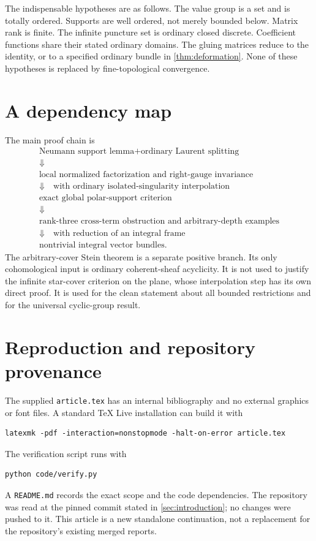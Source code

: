 \documentclass[11pt,letterpaper]{article}
\theoremstyle{definition}
\theoremstyle{remark}
\numberwithin{equation}{section}
\begin{document}
The indispensable hypotheses are as follows. The value group is a set and is totally ordered. Supports are well ordered, not merely bounded below. Matrix rank is finite. The infinite puncture set is ordinary closed discrete. Coefficient functions share their stated ordinary domains. The gluing matrices reduce to the identity, or to a specified ordinary bundle in \cref{thm:deformation}. None of these hypotheses is replaced by fine-topological convergence.

\section{A dependency map}

The main proof chain is
\[
\begin{gathered}
\text{Neumann support lemma}+\text{ordinary Laurent splitting}\\
\Downarrow\\
\text{local normalized factorization and right-gauge invariance}\\
\Downarrow\quad\text{with ordinary isolated-singularity interpolation}\\
\text{exact global polar-support criterion}\\
\Downarrow\\
\text{rank-three cross-term obstruction and arbitrary-depth examples}\\
\Downarrow\quad\text{with reduction of an integral frame}\\
\text{nontrivial integral vector bundles.}
\end{gathered}
\]
The arbitrary-cover Stein theorem is a separate positive branch. Its only cohomological input is ordinary coherent-sheaf acyclicity. It is not used to justify the infinite star-cover criterion on the plane, whose interpolation step has its own direct proof. It is used for the clean statement about all bounded restrictions and for the universal cyclic-group result.

\section{Reproduction and repository provenance}

The supplied \texttt{article.tex} has an internal bibliography and no external graphics or font files. A standard TeX Live installation can build it with
\begin{verbatim}
latexmk -pdf -interaction=nonstopmode -halt-on-error article.tex
\end{verbatim}
The verification script runs with
\begin{verbatim}
python code/verify.py
\end{verbatim}
A \texttt{README.md} records the exact scope and the code dependencies. The repository was read at the pinned commit stated in \cref{sec:introduction}; no changes were pushed to it. This article is a new standalone continuation, not a replacement for the repository's existing merged reports.
\end{document}
